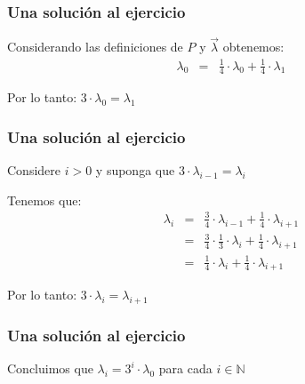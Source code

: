 \begin{frame}
\frametitle{Una solución al ejercicio}


{\small


Considerando las definiciones de $P$ y $\vec \lambda$ obtenemos:
\begin{eqnarray*}
\lambda_0 & = & \frac{1}{4} \cdot \lambda_0 + \frac{1}{4} \cdot \lambda_1
\end{eqnarray*}


Por lo tanto: \alert{$3 \cdot \lambda_0 = \lambda_1$}
}

\end{frame}


\begin{frame}
\frametitle{Una solución al ejercicio}

{\small

Considere $i > 0$ y suponga que $3 \cdot \lambda_{i-1} = \lambda_i$


Tenemos que:
\begin{eqnarray*}
\lambda_{i} & = & \frac{3}{4} \cdot \lambda_{i-1} + \frac{1}{4} \cdot \lambda_{i+1}\\
& = & \frac{3}{4} \cdot \frac{1}{3} \cdot \lambda_{i} + \frac{1}{4} \cdot \lambda_{i+1}\\
& = & \frac{1}{4} \cdot  \lambda_{i} + \frac{1}{4} \cdot \lambda_{i+1}
\end{eqnarray*}


Por lo tanto: \alert{$3 \cdot \lambda_i = \lambda_{i+1}$}
}

\end{frame}


\begin{frame}
\frametitle{Una solución al ejercicio}

{\small

\alert{Concluimos que $\lambda_i = 3^i \cdot \lambda_{0}$ para cada $i \in \mathbb{N}$}






}

\end{frame}


